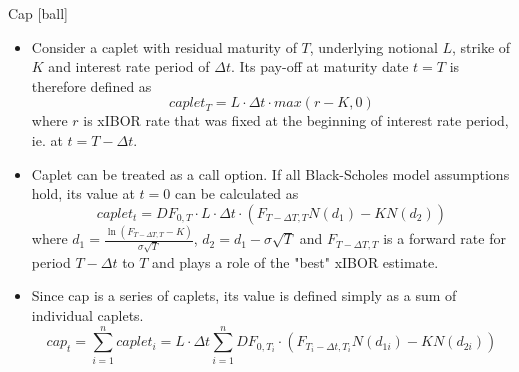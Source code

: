 \documentclass{beamer}
\begin{document}
\begin{frame}{Cap}
[ball]
\begin{itemize}
\item Consider a caplet with residual maturity of $T$, underlying notional $L$, strike of $K$ and interest rate period of $\Delta t$. Its pay-off at maturity date $t = T$ is therefore defined as
\begin{equation}
caplet_T = L \cdot \Delta t \cdot max(r - K, 0)
\end{equation}
where $r$ is xIBOR rate that was fixed at the beginning of interest rate period, ie. at $t = T - \Delta t$.
\item Caplet can be treated as a call option. If all Black-Scholes model assumptions hold, its value at $t = 0$ can be calculated as
\begin{equation}
caplet_t = DF_{0, T} \cdot L \cdot \Delta t \cdot \left(F_{T - \Delta T, T} N(d_1) - KN(d_2) \right)
\end{equation}
where $d_1 = \frac{\ln(F_{T - \Delta T, T} - K)}{\sigma \sqrt{T}}$, $d_2 = d_1 - \sigma \sqrt{T}$ and $F_{T - \Delta T, T}$ is a forward rate for period $T - \Delta t$ to $T$ and plays a role of the "best" xIBOR estimate.
\item Since cap is a series of caplets, its value is defined simply as a sum of individual caplets.
\begin{equation}
cap_t = \sum_{i = 1}^n caplet_i = L \cdot \Delta t \sum_{i = 1}^n DF_{0, T_i} \cdot \left(F_{T_i - \Delta t,T_i} N(d_{1i}) - KN(d_{2i}) \right)
\end{equation}
\end{itemize}
\end{frame}
\end{document}
